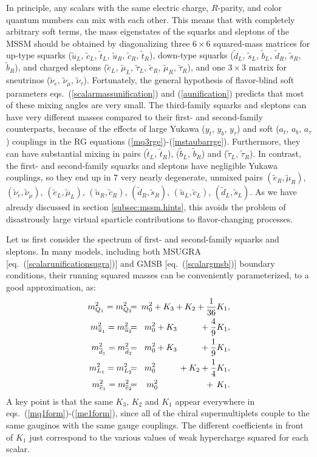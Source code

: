 \documentclass[12pt]{article}
\def\beq{\begin{eqnarray}}
\def\eeq{\end{eqnarray}}
\def\sbar{\overline}
\def\stilde{\widetilde}
\begin{document}
In principle, any scalars with the same electric charge, $R$-parity, and 
color quantum numbers can mix with each other. This means that with 
completely arbitrary soft terms, the mass eigenstates of the squarks and 
sleptons of the MSSM should be obtained by diagonalizing three $6\times 6$ 
squared-mass matrices for up-type squarks ($\stilde u_L$, $\stilde c_L$, 
$\stilde t_L$, $\stilde u_R$, $\stilde c_R$, $\stilde t_R$), down-type 
squarks ($\stilde d_L$, $\stilde s_L$, $\stilde b_L$, $\stilde d_R$, 
$\stilde s_R$, $\stilde b_R$), and charged sleptons ($\stilde e_L$, 
$\stilde \mu_L$, $\stilde \tau_L$, $\stilde e_R$, $\stilde \mu_R$, 
$\stilde \tau_R$), and one $3\times 3$ matrix for sneutrinos ($\stilde 
\nu_e$, $\stilde \nu_\mu$, $\stilde \nu_\tau$). Fortunately, the general 
hypothesis of flavor-blind soft parameters 
eqs.~(\ref{scalarmassunification}) and (\ref{aunification}) predicts that 
most of these mixing angles are very small. The third-family squarks and 
sleptons can have very different masses compared to their first- and 
second-family counterparts, because of the effects of large Yukawa ($y_t$, 
$y_b$, $y_\tau$) and soft ($a_t$, $a_b$, $a_\tau$) couplings in the RG 
equations (\ref{mq3rge})-(\ref{mstaubarrge}). Furthermore, they can have 
substantial mixing in pairs ($\stilde t_L$, $\stilde t_R$), ($\stilde 
b_L$, $\stilde b_R$) and ($\stilde \tau_L$, $\stilde \tau_R$). In 
contrast, the first- and second-family squarks and sleptons have 
negligible Yukawa couplings, so they end up in 7 very nearly degenerate, 
unmixed pairs $(\stilde e_R, \stilde \mu_R)$, $(\stilde \nu_e, \stilde 
\nu_\mu)$, $(\stilde e_L, \stilde \mu_L)$, $(\stilde u_R, \stilde c_R)$, 
$(\stilde d_R, \stilde s_R)$, $(\stilde u_L, \stilde c_L)$, $(\stilde d_L, 
\stilde s_L)$. As we have already discussed in section 
\ref{subsec:mssm.hints}, this avoids the problem of disastrously large 
virtual sparticle contributions to flavor-changing processes.

Let us first consider the spectrum of first- and second-family squarks and 
sleptons. In many models, including both MSUGRA 
[eq.~(\ref{scalarunificationsugra})] and GMSB 
[eq.~(\ref{scalargmsb})] boundary conditions, their running squared masses 
can be conveniently parameterized, to a good approximation, as:
\beq
m_{Q_1}^2 = m_{Q_2}^2  \!\!\!&=&\!\!\! m_0^2 + K_3 + K_2 + {1\over 36}K_1,
\label{mq1form} \\
m_{\sbar u_1}^2 = m_{\sbar u_2}^2 \!\!\! &=&\!\!\! m_0^2 + K_3
\qquad\>\>\>
+ {4\over 9} K_1,
\\
m_{\sbar d_1}^2 = m_{\sbar d_2}^2  \!\!\!&=&\!\!\! m_0^2 + K_3
\qquad\>\>\>
+ {1\over 9} K_1,
\\
m_{L_1}^2 = m_{L_2}^2 \!\!\!&=&\!\!\! m_0^2 \qquad\>\>\> + K_2 + {1\over
4} K_1,
\\
m_{\sbar e_1}^2 = m_{\sbar e_2}^2 \!\!\!&=&\!\!\! m_0^2
\qquad\qquad\>\>\>\>\>\> \, +\, K_1.
\label{me1form}
\eeq
A key point is that the same $K_3$, $K_2$ and $K_1$ appear everywhere in 
eqs.~(\ref{mq1form})-(\ref{me1form}), since all of the chiral 
supermultiplets couple to the same gauginos with the same gauge couplings. 
The different coefficients in front of $K_1$ just correspond to the 
various values of weak hypercharge squared for each scalar.
\end{document}
